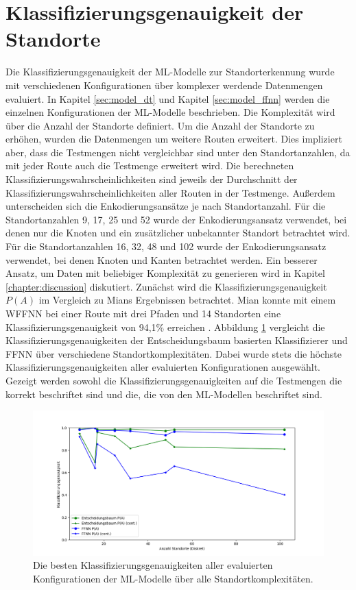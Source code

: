\section{Klassifizierungsgenauigkeit der Standorte}
Die Klassifizierungsgenauigkeit der ML-Modelle zur Standorterkennung wurde mit verschiedenen Konfigurationen über komplexer werdende Datenmengen evaluiert.
In Kapitel \ref{sec:model_dt} und Kapitel \ref{sec:model_ffnn} werden die einzelnen Konfigurationen der ML-Modelle beschrieben.
Die Komplexität wird über die Anzahl der Standorte definiert.
Um die Anzahl der Standorte zu erhöhen, wurden die Datenmengen um weitere Routen erweitert.
Dies impliziert aber, dass die Testmengen nicht vergleichbar sind unter den Standortanzahlen, da mit jeder Route auch die Testmenge erweitert wird.
Die berechneten Klassifizierungswahrscheinlichkeiten sind jeweils der Durchschnitt der Klassifizierungswahrscheinlichkeiten aller Routen in der Testmenge.
\newline
\newline
Außerdem unterscheiden sich die Enkodierungsansätze je nach Standortanzahl.
Für die Standortanzahlen 9, 17, 25 und 52 wurde der Enkodierungsansatz verwendet, bei denen nur die Knoten und ein zusätzlicher unbekannter Standort betrachtet wird.
Für die Standortanzahlen 16, 32, 48 und 102 wurde der Enkodierungsansatz verwendet, bei denen Knoten und Kanten betrachtet werden.
Ein besserer Ansatz, um Daten mit beliebiger Komplexität zu generieren wird in Kapitel \ref{chapter:discussion} diskutiert.
\newline
\newline
Zunächst wird die Klassifizierungsgenauigkeit $P(A)$ im Vergleich zu Mians Ergebnissen betrachtet.
Mian konnte mit einem WFFNN bei einer Route mit drei Pfaden und 14 Standorten eine Klassifizierungsgenauigkeit von 94,1\% erreichen \cite{naveedThesis}.
Abbildung \ref{fig:best_dt_acc_vs_knn_acc_vs_cont} vergleicht die Klassifizierungsgenauigkeiten der
Entscheidungsbaum basierten Klassifizierer und FFNN über verschiedene Standortkomplexitäten.
Dabei wurde stets die höchste Klassifizierungsgenauigkeiten aller evaluierten Konfigurationen ausgewählt.
Gezeigt werden sowohl die Klassifizierungsgenauigkeiten auf die Testmengen die korrekt beschriftet sind und die, die von den ML-Modellen beschriftet sind.
\begin{figure}[h!]
    \centering
    \includegraphics[width=\linewidth]{images/best_dt_vs_knn_acc_vs_acc_cont.png}
    \caption{Die besten Klassifizierungsgenauigkeiten aller evaluierten Konfigurationen der ML-Modelle über alle Standortkomplexitäten.}
    \label{fig:best_dt_acc_vs_knn_acc_vs_cont}
\end{figure}
